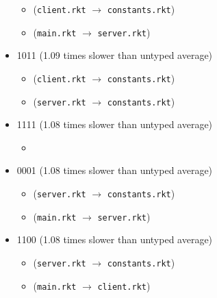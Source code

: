 \documentclass{article}
\newcommand{\mono}[1]{\texttt{#1}}
\begin{document}
\begin{itemize}
  \begin{itemize}
  \item (\mono{client.rkt} $\rightarrow$ \mono{constants.rkt})
  \item (\mono{main.rkt} $\rightarrow$ \mono{server.rkt})
  \end{itemize}
\item 1011 (1.09 times slower than untyped average)
  \begin{itemize}
  \item (\mono{client.rkt} $\rightarrow$ \mono{constants.rkt})
  \item (\mono{server.rkt} $\rightarrow$ \mono{constants.rkt})
  \end{itemize}
\item 1111 (1.08 times slower than untyped average)
  \begin{itemize}
  \item 
  \end{itemize}
\item 0001 (1.08 times slower than untyped average)
  \begin{itemize}
  \item (\mono{server.rkt} $\rightarrow$ \mono{constants.rkt})
  \item (\mono{main.rkt} $\rightarrow$ \mono{server.rkt})
  \end{itemize}
\item 1100 (1.08 times slower than untyped average)
  \begin{itemize}
  \item (\mono{server.rkt} $\rightarrow$ \mono{constants.rkt})
  \item (\mono{main.rkt} $\rightarrow$ \mono{client.rkt})
  \end{itemize}


\end{itemize}
\end{document}
